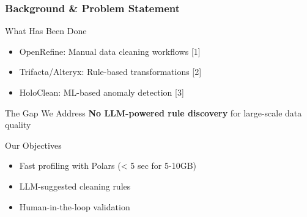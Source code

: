 \documentclass{beamer}
\begin{document}
\begin{frame}
    \frametitle{Background \& Problem Statement}
    
    \begin{block}{What Has Been Done}
        \begin{itemize}
            \item OpenRefine: Manual data cleaning workflows [1]
            \item Trifacta/Alteryx: Rule-based transformations [2]
            \item HoloClean: ML-based anomaly detection [3]
        \end{itemize}
    \end{block}
    
    \vspace{0.15cm}
    
    \begin{alertblock}{The Gap We Address}
        \textbf{No LLM-powered rule discovery} for large-scale data quality
    \end{alertblock}
    
    \vspace{0.15cm}
    
    \begin{exampleblock}{Our Objectives}
        \begin{itemize}
            \item Fast profiling with Polars (< 5 sec for 5-10GB)
            \item LLM-suggested cleaning rules
            \item Human-in-the-loop validation
        \end{itemize}
    \end{exampleblock}
\end{frame}
\end{document}
